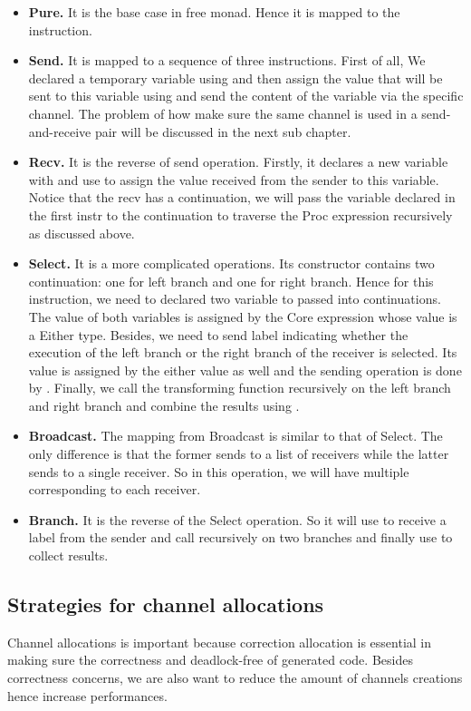 \begin{itemize}
    \item \textbf{Pure. } It is the base case in free monad. Hence it is mapped to the  instruction.
    \item \textbf{Send. } It is mapped to a sequence of three instructions. First of all, We declared a temporary variable using  and then assign the value that will be sent to this variable using  and send the content of the variable via the specific channel. The problem of how make sure the same channel is used in a send-and-receive pair will be discussed in the next sub chapter.
    \item \textbf{Recv. } It is the reverse of send operation. Firstly, it declares a new variable with  and use  to assign the value received from the sender to this variable. Notice that the recv has a continuation, we will pass the variable declared in the first instr to the continuation to traverse the Proc expression recursively as discussed above. 
    \item \textbf{Select. } It is a more complicated operations. Its constructor contains two continuation: one for left branch and one for right branch. Hence for this instruction, we need to declared two variable to passed into continuations. The value of both variables is assigned by the Core expression whose value is a Either type. Besides, we need to send label indicating whether the execution of the left branch or the right branch of the receiver is selected. Its value is assigned by the either value as well and the sending operation is done by . Finally, we call the transforming function recursively on the left branch and right branch and combine the results using .
    \item \textbf{Broadcast. } The mapping from Broadcast is similar to that of Select. The only difference is that the former sends to a list of receivers while the latter sends to a single receiver. So in this operation, we will have multiple  corresponding to each receiver.  
    \item \textbf{Branch. } It is the reverse of the Select operation. So it will use  to receive a label from the sender and call recursively on two branches and finally use  to collect results.
\end{itemize}
\subsection{Strategies for channel allocations}
Channel allocations is important because correction allocation is essential in making sure the correctness and deadlock-free of generated code. Besides correctness concerns, we are also want to reduce the amount of channels creations hence increase performances. 

